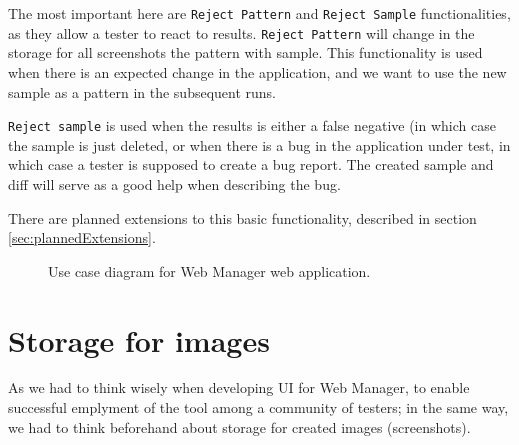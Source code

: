 \documentclass[11pt,oneside,final]{fithesis2}
\begin{document}
    The most important here are \texttt{Reject Pattern} and \texttt{Reject Sample} functionalities, as they allow a tester to react
    to results. \texttt{Reject Pattern} will change in the storage for all screenshots the pattern with sample. This functionality is
    used when there is an expected change in the application, and we want to use the new sample as a pattern in the subsequent runs.
    
    \texttt{Reject sample} is used when the results is either a false negative (in which case the sample is just deleted, or when
    there is a bug in the application under test, in which case a tester is supposed to create a bug report. The created sample and diff
    will serve as a good help when describing the bug. 
    
    There are planned extensions to this basic functionality, described in section \ref{sec:plannedExtensions}.
    
    \begin{figure}[!htb]
      \begin{center}
      \leavevmode
      \centerline{}
      \end{center}
      \caption{Use case diagram for Web Manager web application.}
      \label{fig:useCaseDiagramWebManApp}
    \end{figure}
        
\section{Storage for images}
\label{chap:storage}
    As we had to think wisely when developing UI for Web Manager, to enable successful emplyment of the tool among a community of 
    testers; in the same way, we had to think beforehand about storage for created images (screenshots). 
    
\end{document}
